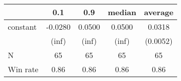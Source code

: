 \begin{tabular}{lcccc}
\hline
         &   0.1   &  0.9   & median & average   \\
\midrule
\midrule
constant & -0.0280 & 0.0500 & 0.0500 & 0.0318    \\
         & (inf)   & (inf)  & (inf)  & (0.0052)  \\
N        & 65      & 65     & 65     & 65        \\
Win rate & 0.86    & 0.86   & 0.86   & 0.86      \\
\hline
\end{tabular}